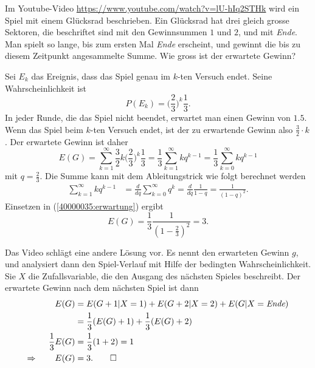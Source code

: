 Im Youtube-Video
\url{https://www.youtube.com/watch?v=lU-hIq2STHk}
wird ein Spiel mit einem Glücksrad beschrieben.
Ein Glücksrad hat drei gleich grosse Sektoren, die beschriftet sind mit
den Gewinnsummen $1$ und $2$, und mit {\em Ende}.
Man spielt so lange, bis zum ersten Mal {\em Ende} erscheint, und gewinnt 
die bis zu diesem Zeitpunkt angesammelte Summe.
Wie gross ist der erwartete Gewinn?

\begin{loesung}
Sei $E_k$ das Ereignis, dass das Spiel genau im $k$-ten Versuch endet.
Seine Wahrscheinlichkeit ist
\[
P(E_k)=\biggl(\frac23\biggr)^k\frac13.
\]
In jeder Runde, die das Spiel nicht beendet, erwartet man einen Gewinn von $1.5$.
Wenn das Spiel beim $k$-ten Versuch endet, ist der zu erwartende Gewinn also
$\frac32\cdot k$.
Der erwartete Gewinn ist daher
\begin{equation}
E(G)
=
\sum_{k=1}^\infty \frac32k\biggl(\frac23\biggr)^k\frac13
=
\frac13\sum_{k=1}^\infty kq^{k-1}
=
\frac13\sum_{k=0}^\infty kq^{k-1}
\label{40000035:erwartung}
\end{equation}
mit $q=\frac23$.
Die Summe kann mit dem Ableitungstrick wie folgt berechnet werden
\begin{align*}
\sum_{k=1}^\infty kq^{k-1}
&=
\frac{d}{dq} \sum_{k=0}^\infty q^k
=
\frac{d}{dq} \frac{1}{1-q}
=
\frac1{(1-q)^2}.
\end{align*}
Einsetzen in (\ref{40000035:erwartung}) ergibt
\[
E(G)=\frac13\frac1{(1-\frac23)^2}=3.
\]

Das Video schlägt eine andere Lösung vor.  
Es nennt den erwarteten Gewinn $g$, und analysiert dann den Spiel-Verlauf mit
Hilfe der bedingten Wahrscheinlichkeit.
Sie $X$ die Zufallsvariable, die den Ausgang des nächsten Spieles beschreibt.
Der erwartete Gewinn nach dem nächsten Spiel ist dann
\begin{align*}
E(G)
&=
E(G+1|X=1)+E(G+2|X=2)+E(G|X=\text{\em Ende})
\\
&=
\frac13(E(G)+1) + \frac13(E(G)+2)
\\
\frac13E(G)
&=\frac13(1+2)=1
\\
\Rightarrow\qquad E(G)&=3.
\qedhere
\end{align*}
\end{loesung}

